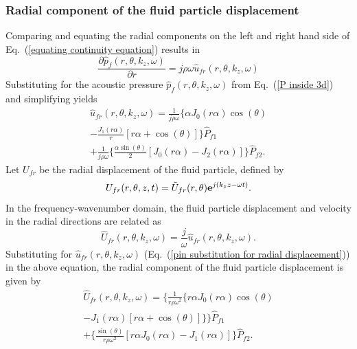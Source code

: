 \documentclass[twocolumn,10pt]{asme2ej}
\begin{document}
\subsubsection{Radial component of the fluid particle displacement}
Comparing and equating the radial components on the left and right hand side of Eq.~(\ref{equating continuity equation}) results in
\begin{equation}\label{pin i direction}
    \frac{\partial \hat{p}_f(r,\theta,k_z,\omega)}{\partial r} = j\rho\omega \hat{u}_{fr}(r,\theta,k_z,\omega)
\end{equation}
Substituting for the acoustic pressure $\hat{p}_f(r,\theta,k_z,\omega)$ from Eq.~(\ref{P inside 3d}) and simplifying yields
\begin{multline}\label{pin substitution for radial displacement}
     \hat{u}_{fr}(r,\theta,k_z,\omega) = \frac{1}{j\rho\omega}\Bigg\{\alpha J_0(r\alpha)\cos(\theta)\\ - \frac{J_1(r\alpha)}{r}[r\alpha + \cos(\theta)]\Bigg\}\hat{P}_{f1}\\ + \frac{1}{j\rho\omega}\Bigg\{\frac{\alpha\sin(\theta)}{2}[J_0(r\alpha) - J_2(r\alpha)]\Bigg\}\hat{P}_{f2}.
\end{multline}
Let $U_{fr}$ be the radial displacement of the fluid particle, defined by 
\begin{equation}\label{rad disp 3d derivation}
    U_{fr}(r,\theta,z,t) = \Tilde{U}_{fr}(r,\theta) \mathbf{e}^{j(k_z z - \omega t)}.
\end{equation}
In the frequency-wavenumber domain, the fluid particle displacement and velocity in the radial directions are related as
\begin{equation}\label{equating radial disp and vel}
    \hat{U}_{fr}(r,\theta,k_z,\omega) = \frac{j}{\omega}\hat{u}_{fr}(r,\theta,k_z,\omega).
\end{equation}
Substituting for $\hat{u}_{fr}(r,\theta,k_z,\omega)$ (Eq.~(\ref{pin substitution for radial displacement})) in the above equation, the radial component of the fluid particle displacement is given by
\begin{multline}\label{radial displacement inside 3d}
    \hat{U}_{fr}(r,\theta,k_z,\omega) = \Bigg\{\frac{1}{r\rho\omega^2}\{r\alpha J_0(r\alpha)\cos(\theta)\\ - J_1(r\alpha)[r\alpha + \cos(\theta)]\}\Bigg\}\hat{P}_{f1}\\ + \Bigg\{\frac{\sin(\theta)}{r\rho\omega^2}[r\alpha J_0(r\alpha) - J_1(r\alpha)]\Bigg\}\hat{P}_{f2}.
\end{multline}
\end{document}
